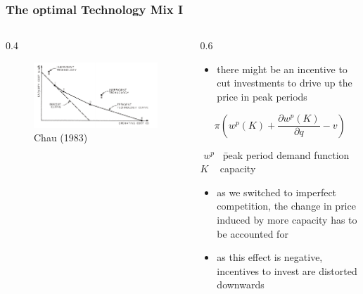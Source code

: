 			\begin{frame}

\frametitle{The optimal Technology Mix I}
\begin{columns}
\begin{column} {0.4\textwidth}

\begin{figure}[h]
\centering
\includegraphics[width=1.\textwidth]{capacity/technology_choice_chow}
    \caption{Chau (1983)}
    \label{fig:Daten 2004}            
\end{figure}
\end{column}

\begin{column} {0.6\textwidth}
\begin{itemize}
\item there might be an incentive to cut investments to drive up the price in peak periods
\end {itemize}

\begin{equation}
\pi (w^p(K)+\frac{\partial w^p(K)}{\partial q}-v)
\end{equation}

{\small
\begin{tabbing}
\= $w^p$ \  \= peak period demand function \\
\> $K$   \    \> capacity
\end{tabbing}}

\begin{itemize}
\item as we switched to imperfect competition, the change in price induced by more capacity has to be accounted for
\item as this effect is negative, incentives to invest are distorted downwards
\end {itemize}

\end{column}
\end{columns}
	

			\end{frame}